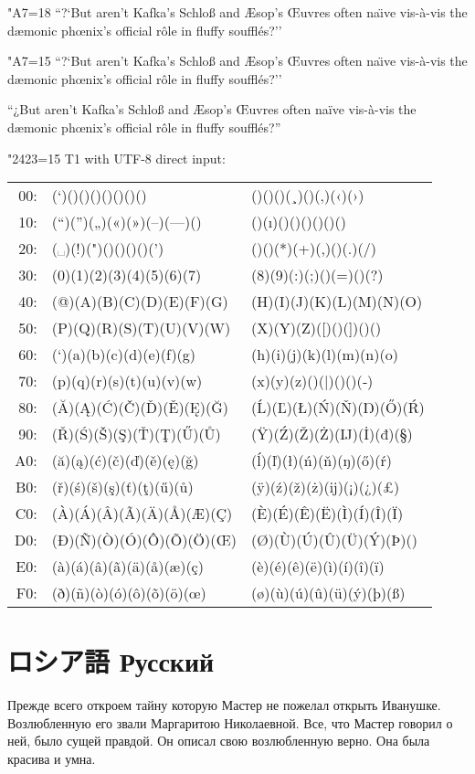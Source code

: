 \documentclass{ujarticle}
\begin{document}
\kcatcode"A7=18%
``?`But aren't Kafka's Schlo{\ss} and {\AE}sop's {\OE}uvres
often na{\"\i}ve  vis-\`a-vis the d{\ae}monic ph{\oe}nix's official r\^ole
in fluffy souffl\'es?''

\kcatcode"A7=15%
``?`But aren't Kafka's Schlo{\ss} and {\AE}sop's {\OE}uvres
often na{\"\i}ve  vis-\`a-vis the d{\ae}monic ph{\oe}nix's official r\^ole
in fluffy souffl\'es?''

“¿But aren’t Kafka’s Schloß and Æsop’s Œuvres
often naïve vis-à-vis the dæmonic phœnix’s official rôle
in fluffy soufflés?”

\noindent
\kcatcode"2423=15%
T1 with UTF-8 direct input:\\
\begin{center}\begin{tabular}{r|l|l|}
00:&(`)()()()()()()()&()()()(¸)()(‚)(‹)(›)\\
10:&(“)(”)(„)(«)(»)(–)(—)()&()(ı)()()()()()()\\
20:&(␣)(!)(")()()()()(’)&()()(*)(+)(,)()(.)(/)\\
30:&(0)(1)(2)(3)(4)(5)(6)(7)&(8)(9)(:)(;)()(=)()(?)\\
40:&(@)(A)(B)(C)(D)(E)(F)(G)&(H)(I)(J)(K)(L)(M)(N)(O)\\
50:&(P)(Q)(R)(S)(T)(U)(V)(W)&(X)(Y)(Z)([)()(])()()\\
60:&(‘)(a)(b)(c)(d)(e)(f)(g)&(h)(i)(j)(k)(l)(m)(n)(o)\\
70:&(p)(q)(r)(s)(t)(u)(v)(w)&(x)(y)(z)()(|)()()(‐)\\
80:&(Ă)(Ą)(Ć)(Č)(Ď)(Ě)(Ę)(Ğ)&(Ĺ)(Ľ)(Ł)(Ń)(Ň)(Ŋ)(Ő)(Ŕ)\\
90:&(Ř)(Ś)(Š)(Ş)(Ť)(Ţ)(Ű)(Ů)&(Ÿ)(Ź)(Ž)(Ż)(Ĳ)(İ)(đ)(§)\\
A0:&(ă)(ą)(ć)(č)(ď)(ě)(ę)(ğ)&(ĺ)(ľ)(ł)(ń)(ň)(ŋ)(ő)(ŕ)\\
B0:&(ř)(ś)(š)(ş)(ť)(ţ)(ű)(ů)&(ÿ)(ź)(ž)(ż)(ĳ)(¡)(¿)(£)\\
C0:&(À)(Á)(Â)(Ã)(Ä)(Å)(Æ)(Ç)&(È)(É)(Ê)(Ë)(Ì)(Í)(Î)(Ï)\\
D0:&(Ð)(Ñ)(Ò)(Ó)(Ô)(Õ)(Ö)(Œ)&(Ø)(Ù)(Ú)(Û)(Ü)(Ý)(Þ)()\\
E0:&(à)(á)(â)(ã)(ä)(å)(æ)(ç)&(è)(é)(ê)(ë)(ì)(í)(î)(ï)\\
F0:&(ð)(ñ)(ò)(ó)(ô)(õ)(ö)(œ)&(ø)(ù)(ú)(û)(ü)(ý)(þ)(ß)\\
\end{tabular}\end{center}


\section{ロシア語 \selectfont{}Русский}
\selectfont
Прежде всего откроем тайну которую Мастер не пожелал
открыть Иванушке.
Возлюбленную его звали Маргаритою Николаевной.
Все, что Мастер говорил о ней, было сущей правдой.
Он описал свою возлюбленную верно.
Она была красива и умна.
\end{document}
